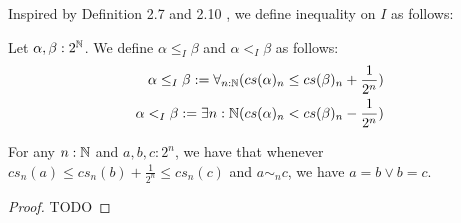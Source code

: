 Inspired by Definition 2.7 and 2.10 \Cite{Bishop}, 
we define inequality on $I$ as follows:
\begin{definition}
  Let $\alpha,\beta:2^{\mathbb{N}}$. 
  We define $\alpha\leq_I \beta$ and $\alpha<_I\beta$ as follows:
  \begin{align}
  \alpha\leq_I\beta : = \forall_{n:\mathbb{N}} ( cs(\alpha)_n \leq cs(\beta)_n + \frac {1} {2^n})\\ 
    \alpha   <_I \beta : = \exists{n:\mathbb{N}} ( cs(\alpha)_n < cs(\beta)_n - \frac {1} {2^n})
\end{align}
\end{definition}

\begin{lemma}\label{SqueezeLemma}
  For any $n:\mathbb{N}$ and $a,b,c:2^n$, we have that whenever 
  $cs_n(a) \leq cs_n(b)+\frac{1}{2^n} \leq cs_n(c)$ and $a\sim_n c$, we have 
  $a = b \vee b = c$. 
\end{lemma}
\begin{proof}
TODO
\end{proof}

